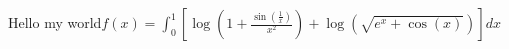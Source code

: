 \documentclass[preview]{standalone}
\begin{document}
\begin{center}
Hello my world$f(x) = \int_{0}^{1} \left[ \log\left( 1 + \frac{\sin\left( \frac{1}{x} \right)}{x^2} \right) + \log\left( \sqrt{e^x + \cos(x)} \right) \right] dx$
\end{center}
\end{document}
